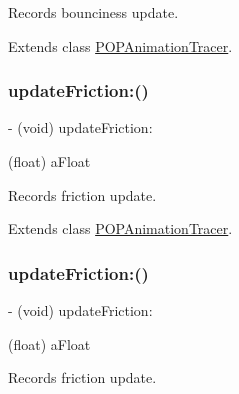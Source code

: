 Records bounciness update. 

Extends class \mbox{\hyperlink{interface_p_o_p_animation_tracer_a61998b16b4eb5df6d11dbd0bd269339c}{P\+O\+P\+Animation\+Tracer}}.

\mbox{\label{category_p_o_p_animation_tracer_07_internal_08_aba012bff58a203420d1adf3e922491e0}} 
\subsubsection{\texorpdfstring{update\+Friction\+:()}{updateFriction:()}\hspace{0.1cm}{\footnotesize\ttfamily [1/2]}}
{\footnotesize\ttfamily -\/ (void) update\+Friction\+: \begin{DoxyParamCaption}\item[{(float)}]{a\+Float }\end{DoxyParamCaption}}

Records friction update. 

Extends class \mbox{\hyperlink{interface_p_o_p_animation_tracer_aba012bff58a203420d1adf3e922491e0}{P\+O\+P\+Animation\+Tracer}}.

\mbox{\label{category_p_o_p_animation_tracer_07_internal_08_aba012bff58a203420d1adf3e922491e0}} 
\subsubsection{\texorpdfstring{update\+Friction\+:()}{updateFriction:()}\hspace{0.1cm}{\footnotesize\ttfamily [2/2]}}
{\footnotesize\ttfamily -\/ (void) update\+Friction\+: \begin{DoxyParamCaption}\item[{(float)}]{a\+Float }\end{DoxyParamCaption}}

Records friction update. 


